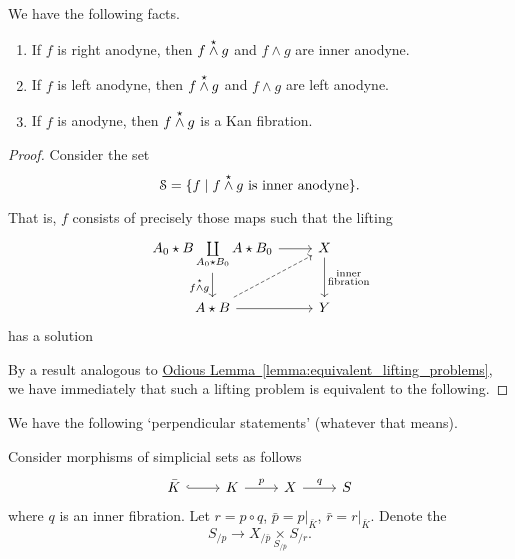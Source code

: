 \documentclass[main.tex]{subfiles}
\begin{document}
\begin{proposition}
  We have the following facts.
  \begin{enumerate}
    \item If $f$ is right anodyne, then $f \overset{\star}{\wedge} g$ and $f \wedge g$ are inner anodyne.

    \item If $f$ is left anodyne, then $f \overset{\star}{\wedge} g$ and $f \wedge g$ are left anodyne.

    \item If $f$ is anodyne, then $f \overset{\star}{\wedge} g$ is a Kan fibration.
  \end{enumerate}
\end{proposition}
\begin{proof}
  Consider the set
  \begin{equation*}
    \mathcal{S} = \{f \mid f \overset{\star}{\wedge} g \text{ is inner anodyne}\}.
  \end{equation*}

  That is, $f$ consists of precisely those maps such that the lifting
  \begin{equation*}
    \begin{tikzcd}
      A_{0} \star B \coprod\limits_{A_{0} \star B_{0}} A \star B_{0}
      \arrow[r]
      \arrow[d, swap, "f \ssmash g"]
      & X
      \arrow[d, "\substack{\text{inner}\\\text{fibration}}"]
      \\
      A \star B
      \arrow[r]
      \arrow[ur, dashed]
      & Y
    \end{tikzcd}
  \end{equation*}
  has a solution

  By a result analogous to \hyperref[lemma:equivalent_lifting_problems]{Odious Lemma~\ref*{lemma:equivalent_lifting_problems}}, we have immediately that such a lifting problem is equivalent to the following.
  
\end{proof}


We have the following `perpendicular statements' (whatever that means).

\begin{fact}
  Consider morphisms of simplicial sets as follows
  \begin{equation*}
    \begin{tikzcd}
      \bar{K}
      \arrow[r, hookrightarrow]
      & K
      \arrow[r, "p"]
      & X
      \arrow[r, "q"]
      & S
    \end{tikzcd}
  \end{equation*}
  where $q$ is an inner fibration. Let $r = p \circ q$, $\bar{p} = p|_{\bar{K}}$, $\bar{r} = r|_{\bar{K}}$. Denote the
  \begin{equation*}
    S_{/p} \to X_{/\bar{p}} \underset{S_{/\bar{p}}}{\times} S_{/r}.
  \end{equation*}
\end{fact}
\end{document}
